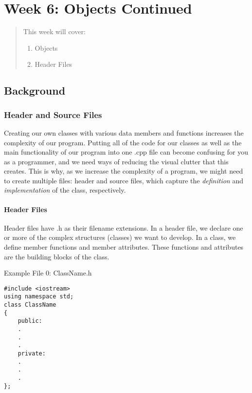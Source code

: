 \chapter*{Week 6: Objects Continued}
\setcounter{chapter}{7}
\setcounter{section}{0}

\begin{abstract}
This week will cover:
\begin{enumerate}
    \item Objects
    \item Header Files
\end{enumerate}
    
\end{abstract}



\section{Background}
\subsection{Header and Source Files}
Creating our own classes with various data members and functions increases the complexity of our program. Putting all of the code for our classes as well as the main functionality of our program into one .cpp file can become confusing for you as a programmer, and we need ways of reducing the visual clutter that this creates. This is why, as we increase the complexity of a program, we might need to create multiple files: header and source files, which capture the \textit{definition} and \textit{implementation} of the class, respectively.

\subsubsection{Header Files}

Header files have .h as their filename extensions. In a header file, we declare one or more of the complex structures (classes) we want to develop. In a class, we define member functions and member attributes. These functions and attributes are the building blocks of the class.

\begin{example}
    Example File 0: ClassName.h
    \begin{verbatim}
#include <iostream> 
using namespace std; 
class ClassName 
{ 
    public: 
    . 
    . 
    . 
    private: 
    . 
    . 
    . 
};

    \end{verbatim}
\end{example}

